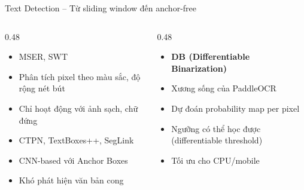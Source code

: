 \documentclass[aspectratio=169, 10pt]{beamer}
\begin{document}
\begin{frame}{Text Detection -- Từ sliding window đến anchor-free}
 \begin{columns}[T]
 \begin{column}{0.48\textwidth}
 \begin{tcolorbox}[colback=gray!8, colframe=graytext, title={Thế hệ 1 (trước 2015)}, fonttitle=\bfseries, rounded corners, boxrule=0.5pt]
 \begin{itemize}
 \item MSER, SWT
 \item Phân tích pixel theo màu sắc, độ rộng nét bút
 \item Chỉ hoạt động với ảnh sạch, chữ đứng
 \end{itemize}
 \end{tcolorbox}
 \vspace{0.2cm}
 \begin{tcolorbox}[colback=orange!8, colframe=warning, title={Thế hệ 2 (2015--2017)}, fonttitle=\bfseries, rounded corners, boxrule=0.5pt]
 \begin{itemize}
 \item CTPN, TextBoxes++, SegLink
 \item CNN-based với Anchor Boxes
 \item Khó phát hiện văn bản cong
 \end{itemize}
 \end{tcolorbox}
 \end{column}
 \begin{column}{0.48\textwidth}
 \begin{tcolorbox}[colback=accentlight, colframe=accent, title={Thế hệ 3 (2018--nay)}, fonttitle=\bfseries, rounded corners, boxrule=0.8pt]
 \begin{itemize}
 \item \textbf{DB (Differentiable Binarization)}
 \item Xương sống của PaddleOCR
 \item Dự đoán probability map per pixel
 \item Ngưỡng có thể học được (differentiable threshold)
 \item Tối ưu cho CPU/mobile
 \end{itemize}
 \end{tcolorbox}
 \end{column}
 \end{columns}
\end{frame}
\end{document}
